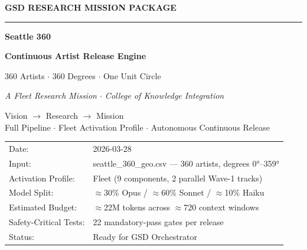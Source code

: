 \documentclass[11pt,letterpaper]{article}
\begin{document}
\thispagestyle{empty}
\begin{center}
\vspace*{2.5cm}

{\small\sffamily\textcolor{primary}{\textbf{GSD RESEARCH MISSION PACKAGE}}}

\vspace{0.3cm}
\textcolor{bordergray}{\rule{9cm}{0.4pt}}

\vspace{1.2cm}
{\fontsize{30}{36}\selectfont\bfseries\sffamily\textcolor{primary}{Seattle 360}}

\vspace{0.4cm}
{\fontsize{16}{20}\selectfont\bfseries\sffamily\textcolor{secondary}{Continuous Artist Release Engine}}

\vspace{0.6cm}
{\Large\sffamily\textcolor{tertiary}{360 Artists $\cdot$ 360 Degrees $\cdot$ One Unit Circle}}

\vspace{0.4cm}
{\large\sffamily\itshape\textcolor{subtlegray}{A Fleet Research Mission $\cdot$ College of Knowledge Integration}}

\vspace{2.5cm}
{\sffamily\textcolor{accent}{Vision $\rightarrow$ Research $\rightarrow$ Mission}}\\[0.4em]
{\small\sffamily\textcolor{accent}{Full Pipeline $\cdot$ Fleet Activation Profile $\cdot$ Autonomous Continuous Release}}

\vspace{2cm}
\begin{tabular}{ll}
\textcolor{subtlegray}{\sffamily\small Date:} & \textcolor{darktext}{\sffamily\small 2026-03-28} \\[4pt]
\textcolor{subtlegray}{\sffamily\small Input:} & \textcolor{darktext}{\sffamily\small seattle\_360\_geo.csv — 360 artists, degrees 0°–359°} \\[4pt]
\textcolor{subtlegray}{\sffamily\small Activation Profile:} & \textcolor{darktext}{\sffamily\small Fleet (9 components, 2 parallel Wave-1 tracks)} \\[4pt]
\textcolor{subtlegray}{\sffamily\small Model Split:} & \textcolor{darktext}{\sffamily\small $\approx$30\% Opus / $\approx$60\% Sonnet / $\approx$10\% Haiku} \\[4pt]
\textcolor{subtlegray}{\sffamily\small Estimated Budget:} & \textcolor{darktext}{\sffamily\small $\approx$22M tokens across $\approx$720 context windows} \\[4pt]
\textcolor{subtlegray}{\sffamily\small Safety-Critical Tests:} & \textcolor{darktext}{\sffamily\small 22 mandatory-pass gates per release} \\[4pt]
\textcolor{subtlegray}{\sffamily\small Status:} & \textcolor{darktext}{\sffamily\small Ready for GSD Orchestrator} \\
\end{tabular}


\end{center}
\end{document}
